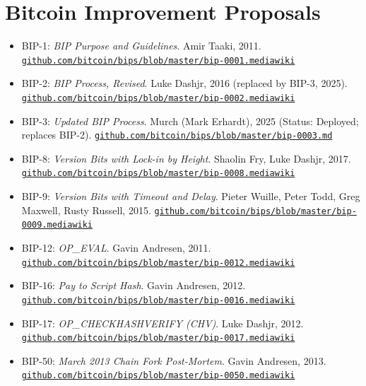 \documentclass[11pt, twoside, openright]{book}
\begin{document}
\section*{Bitcoin Improvement Proposals}
\begin{itemize}[leftmargin=1.5em, itemsep=4pt]
  \item BIP-1: \textit{BIP Purpose and Guidelines}. Amir Taaki, 2011. \href{https://github.com/bitcoin/bips/blob/master/bip-0001.mediawiki}{\nolinkurl{github.com/bitcoin/bips/blob/master/bip-0001.mediawiki}}
  \item BIP-2: \textit{BIP Process, Revised}. Luke Dashjr, 2016 (replaced by BIP-3, 2025). \href{https://github.com/bitcoin/bips/blob/master/bip-0002.mediawiki}{\nolinkurl{github.com/bitcoin/bips/blob/master/bip-0002.mediawiki}}
  \item BIP-3: \textit{Updated BIP Process}. Murch (Mark Erhardt), 2025 (Status: Deployed; replaces BIP-2). \href{https://github.com/bitcoin/bips/blob/master/bip-0003.md}{\nolinkurl{github.com/bitcoin/bips/blob/master/bip-0003.md}}
  \item BIP-8: \textit{Version Bits with Lock-in by Height}. Shaolin Fry, Luke Dashjr, 2017. \href{https://github.com/bitcoin/bips/blob/master/bip-0008.mediawiki}{\nolinkurl{github.com/bitcoin/bips/blob/master/bip-0008.mediawiki}}
  \item BIP-9: \textit{Version Bits with Timeout and Delay}. Pieter Wuille, Peter Todd, Greg Maxwell, Rusty Russell, 2015. \href{https://github.com/bitcoin/bips/blob/master/bip-0009.mediawiki}{\nolinkurl{github.com/bitcoin/bips/blob/master/bip-0009.mediawiki}}
  \item BIP-12: \textit{OP\_EVAL}. Gavin Andresen, 2011. \href{https://github.com/bitcoin/bips/blob/master/bip-0012.mediawiki}{\nolinkurl{github.com/bitcoin/bips/blob/master/bip-0012.mediawiki}}
  \item BIP-16: \textit{Pay to Script Hash}. Gavin Andresen, 2012. \href{https://github.com/bitcoin/bips/blob/master/bip-0016.mediawiki}{\nolinkurl{github.com/bitcoin/bips/blob/master/bip-0016.mediawiki}}
  \item BIP-17: \textit{OP\_CHECKHASHVERIFY (CHV)}. Luke Dashjr, 2012. \href{https://github.com/bitcoin/bips/blob/master/bip-0017.mediawiki}{\nolinkurl{github.com/bitcoin/bips/blob/master/bip-0017.mediawiki}}
  \item BIP-50: \textit{March 2013 Chain Fork Post-Mortem}. Gavin Andresen, 2013. \href{https://github.com/bitcoin/bips/blob/master/bip-0050.mediawiki}{\nolinkurl{github.com/bitcoin/bips/blob/master/bip-0050.mediawiki}}

\end{itemize}
\end{document}

